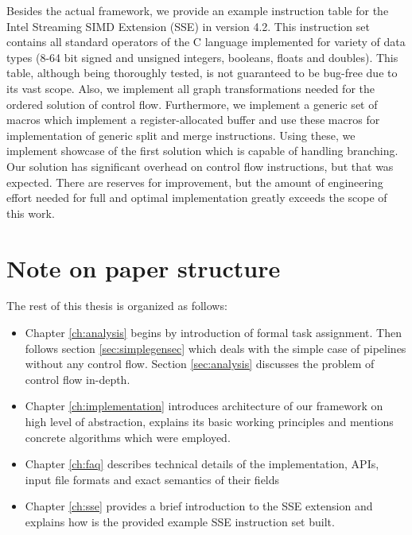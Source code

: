 Besides the actual framework, we provide an example instruction table for the Intel Streaming SIMD Extension (SSE) in version 4.2. This instruction set contains all standard operators of the C language implemented for variety of data types (8-64 bit signed and unsigned integers, booleans, floats and doubles). This table, although being thoroughly tested, is not guaranteed to be bug-free due to its vast scope. Also, we implement all graph transformations needed for the ordered solution of control flow. Furthermore, we implement a generic set of macros which implement a register-allocated buffer and use these macros for implementation of generic split and merge instructions. Using these, we implement showcase of the first solution which is capable of handling branching. Our solution has significant overhead on control flow instructions, but that was expected. There are reserves for improvement, but the amount of engineering effort needed for full and optimal implementation greatly exceeds the scope of this work.

\section{Note on paper structure}

The rest of this thesis is organized as follows:
\begin{itemize}
  \item Chapter \ref{ch:analysis} begins by introduction of formal task assignment. Then follows section \ref{sec:simplegensec} which deals with the simple case of pipelines without any control flow. Section \ref{sec:analysis} discusses the problem of control flow in-depth.
  \item Chapter \ref{ch:implementation} introduces architecture of our framework on high level of abstraction, explains its basic working principles and mentions concrete algorithms which were employed.
  \item Chapter \ref{ch:faq} describes technical details of the implementation, APIs, input file formats and exact semantics of their fields
  \item Chapter \ref{ch:sse} provides a brief introduction to the SSE extension and explains how is the provided example SSE instruction set built.
\end{itemize}



